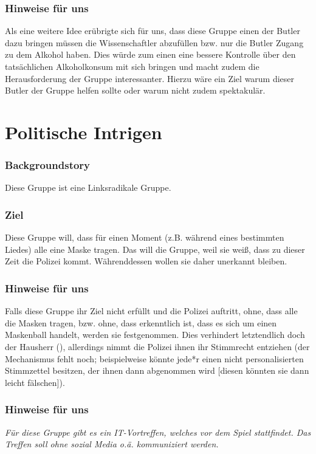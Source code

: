 \documentclass[12pt, a4paper, openany]{report}
\begin{document}
\subsubsection {Hinweise für uns }
Als eine weitere Idee erübrigte sich für uns, dass diese Gruppe einen der Butler dazu bringen müssen die Wissenschaftler abzufüllen bzw. nur die Butler Zugang zu dem Alkohol haben. Dies würde zum einen eine bessere Kontrolle über den tatsächlichen Alkoholkonsum mit sich bringen und macht zudem die Herausforderung der Gruppe interessanter. Hierzu wäre ein Ziel warum dieser Butler der Gruppe helfen sollte oder warum nicht zudem spektakulär. 

\section{Politische Intrigen}
\subsubsection{Backgroundstory}
Diese Gruppe ist eine Linksradikale Gruppe.
\subsubsection{Ziel}
Diese Gruppe will, dass für einen Moment (z.B. während eines bestimmten Liedes) alle eine Maske tragen. 
Das will die Gruppe, weil sie weiß, dass zu dieser Zeit die Polizei kommt.
Währenddessen wollen sie daher unerkannt bleiben.

\subsubsection{Hinweise für uns}
Falls diese Gruppe ihr Ziel nicht erfüllt und die Polizei auftritt, ohne, dass alle die Masken tragen, bzw. ohne, dass erkenntlich ist, dass es sich um einen Maskenball handelt, werden sie festgenommen.
Dies verhindert letztendlich doch der Hausherr (), allerdings nimmt die Polizei ihnen ihr Stimmrecht entziehen (der Mechanismus fehlt noch; beispielweise könnte jede*r einen nicht personalisierten Stimmzettel besitzen, der ihnen dann abgenommen wird [diesen könnten sie dann leicht fälschen]). 

\subsubsection{Hinweise für uns}
\emph{Für diese Gruppe gibt es ein IT-Vortreffen, welches vor dem Spiel stattfindet.
Das Treffen soll ohne sozial Media o.ä. kommuniziert werden.}
\end{document}
